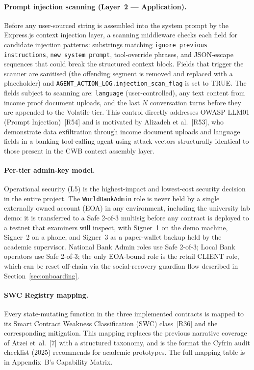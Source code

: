 \documentclass[12pt,a4paper]{report}
\begin{document}
\paragraph{Prompt injection scanning (Layer~2 --- Application).} Before any
user-sourced string is assembled into the system prompt by the Express.js context
injection layer, a scanning middleware checks each field for candidate injection
patterns: substrings matching \texttt{ignore previous instructions},
\texttt{new system prompt}, tool-override phrases, and JSON-escape sequences that
could break the structured context block. Fields that trigger the scanner are
sanitised (the offending segment is removed and replaced with a placeholder) and
\texttt{AGENT\_ACTION\_LOG.injection\_scan\_flag} is set to TRUE. The fields
subject to scanning are: \texttt{language} (user-controlled), any text content
from income proof document uploads, and the last $N$ conversation turns before
they are appended to the Volatile tier. This control directly addresses OWASP
LLM01 (Prompt Injection)~[R54] and is motivated by Alizadeh et
al.~[R53], who demonstrate data exfiltration through
income document uploads and language fields in a banking tool-calling agent using
attack vectors structurally identical to those present in the CWB context assembly
layer.

\paragraph{Per-tier admin-key model.}
Operational security (L5) is the highest-impact and lowest-cost security decision in the entire project. The \texttt{WorldBankAdmin} role is never held by a single externally owned account (EOA) in any environment, including the university lab demo: it is transferred to a Safe 2-of-3 multisig before any contract is deployed to a testnet that examiners will inspect, with Signer~1 on the demo machine, Signer~2 on a phone, and Signer~3 as a paper-wallet backup held by the academic supervisor. National Bank Admin roles use Safe 2-of-3; Local Bank operators use Safe 2-of-3; the only EOA-bound role is the retail CLIENT role, which can be reset off-chain via the social-recovery guardian flow described in Section~\ref{sec:onboarding}.

\paragraph{SWC Registry mapping.}
Every state-mutating function in the three implemented contracts is mapped to its Smart Contract Weakness Classification (SWC) class~[R36] and the corresponding mitigation. This mapping replaces the previous narrative coverage of Atzei et~al.~[7] with a structured taxonomy, and is the format the Cyfrin audit checklist (2025) recommends for academic prototypes. The full mapping table is in Appendix~B's Capability Matrix.
\end{document}
